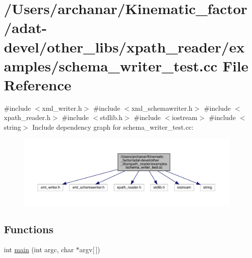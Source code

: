 \hypertarget{adat-devel_2other__libs_2xpath__reader_2examples_2schema__writer__test_8cc}{}\section{/\+Users/archanar/\+Kinematic\+\_\+factor/adat-\/devel/other\+\_\+libs/xpath\+\_\+reader/examples/schema\+\_\+writer\+\_\+test.cc File Reference}
\label{adat-devel_2other__libs_2xpath__reader_2examples_2schema__writer__test_8cc}
{\ttfamily \#include $<$xml\+\_\+writer.\+h$>$}\newline
{\ttfamily \#include $<$xml\+\_\+schemawriter.\+h$>$}\newline
{\ttfamily \#include $<$xpath\+\_\+reader.\+h$>$}\newline
{\ttfamily \#include $<$stdlib.\+h$>$}\newline
{\ttfamily \#include $<$iostream$>$}\newline
{\ttfamily \#include $<$string$>$}\newline
Include dependency graph for schema\+\_\+writer\+\_\+test.\+cc\+:
\nopagebreak
\begin{figure}[H]
\begin{center}
\leavevmode
\includegraphics[width=350pt]{d3/d3b/adat-devel_2other__libs_2xpath__reader_2examples_2schema__writer__test_8cc__incl}
\end{center}
\end{figure}
\subsection*{Functions}
\begin{DoxyCompactItemize}
\item 
int \mbox{\hyperlink{adat-devel_2other__libs_2xpath__reader_2examples_2schema__writer__test_8cc_a0ddf1224851353fc92bfbff6f499fa97}{main}} (int argc, char $\ast$argv\mbox{[}$\,$\mbox{]})
\end{DoxyCompactItemize}


